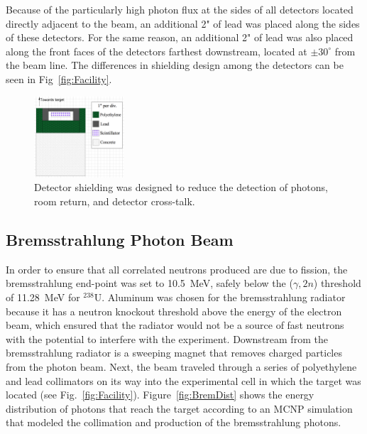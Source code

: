 \documentclass[%
 reprint,
 amsmath,amssymb,
 aps,
 nofootinbib
]{revtex4-1}
\begin{document}
Because of the particularly high photon flux at the sides of all detectors located directly adjacent to the beam, an additional 2" of lead was placed along the sides of these detectors.
For the same reason, an additional 2" of lead was also placed along the front faces of the detectors farthest downstream, located at $\pm30^{\circ}$ from the beam line.
The differences in shielding design among the detectors can be seen in Fig~\ref{fig:Facility}.
\begin{figure}
    \includegraphics[width = 0.30\textwidth]{DetShielding.png}
    \caption{Detector shielding was designed to reduce the detection of photons, room return, and detector cross-talk.}
    \label{fig:shielding}
\end{figure}

\subsection{Bremsstrahlung Photon Beam}
\label{beam}
In order to ensure that all correlated neutrons produced are due to fission, the bremsstrahlung end-point was set to 10.5~MeV, safely below the ($\gamma, 2n$) threshold of 11.28~MeV for $^{238}$U.
Aluminum was chosen for the bremsstrahlung radiator because it has a neutron knockout threshold above the energy of the electron beam, which ensured that the radiator would not be a source of fast neutrons with the potential to interfere with the experiment.
Downstream from the bremsstrahlung radiator is a sweeping magnet that removes charged particles from the photon beam.
Next, the beam traveled through a series of polyethylene and lead collimators on its way into the experimental cell in which the target was located (see Fig.~\ref{fig:Facility}).
Figure~\ref{fig:BremDist} shows the energy distribution of photons that reach the target according to an MCNP simulation that modeled the collimation and production of the bremsstrahlung photons.
\end{document}
